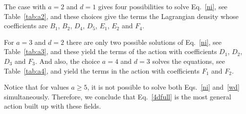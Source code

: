 The case with $a=2$ and $d=1$ gives four possibilities to solve Eq.~\eqref{ni}, see  Table~\ref{tab:a2}, and these choices give the terms the Lagrangian density whose coefficients are $B_1$, $B_2$, $D_4$, $D_5$, $E_1$, $E_2$ and $F_4$.

For $a=3$ and $d=2$ there are only two possible solutions of Eq.~\eqref{ni}, see  Table~\ref{tab:a3}, and these yield the terms of the action with coefficients $D_1$, $D_2$, $D_3$ and $F_3$. And also, the choice $a=4$ and $d=3$ solves the equations, see  Table~\ref{tab:a4}, and yield the terms in the action with coefficients $F_1$ and $F_2$.

Notice that for values $a \ge 5$, it is not possible to solve both Eqs.~\eqref{ni} and~\eqref{wd} simultaneously. Therefore, we conclude that Eq.~\eqref{4dfull} is the most general action built up with these fields.

